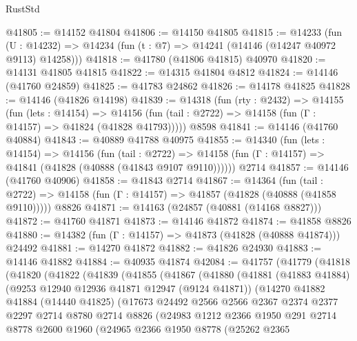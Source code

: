 \begin{lexlean}{RustStd}
\begin{coremodule}
@41805 := @14152 @41804
@41806 := @14150 @41805
@41815 := @14233
    (fun (U : @14232) => @14234 (fun (t : @7) => @14241 (@14146 (@14247 @40972 @9113) @14258)))
@41818 := @41780 (@41806 @41815) @40970
@41820 := @14131 @41805 @41815
@41822 := @14315 @41804 @4812
@41824 := @14146 (@41760 @24859)
@41825 := @41783 @24862
@41826 := @14178 @41825
@41828 := @14146 (@41826 @14198)
@41839 := @14318
    (fun (rty : @2432) =>
    @14155
      (fun (lets : @14154) =>
      @14156 (fun (tail : @2722) => @14158 (fun (Γ : @14157) => @41824 (@41828 @41793)))))
    @8598
@41841 := @14146 (@41760 @40884)
@41843 := @40889 @41788 @40975
@41855 := @14340
    (fun (lets : @14154) =>
    @14156
      (fun (tail : @2722) =>
      @14158 (fun (Γ : @14157) => @41841 (@41828 (@40888 (@41843 @9107 @9110))))))
    @2714
@41857 := @14146 (@41760 @40906)
@41858 := @41843 @2714
@41867 := @14364
    (fun (tail : @2722) => @14158 (fun (Γ : @14157) => @41857 (@41828 (@40888 (@41858 @9110)))))
    @8826
@41871 := @14163 (@24857 (@40881 (@14168 @8827)))
@41872 := @41760 @41871
@41873 := @14146 @41872
@41874 := @41858 @8826
@41880 := @14382 (fun (Γ : @14157) => @41873 (@41828 (@40888 @41874))) @24492
@41881 := @14270 @41872
@41882 := @41826 @24930
@41883 := @14146 @41882
@41884 := @40935 @41874
@42084 := @41757
    (@41779
      (@41818
        (@41820
          (@41822
            (@41839
              (@41855
                (@41867
                  (@41880
                    (@41881
                      (@41883 @41884)
                      (@9253 @12940 @12936 @41871 @12947 (@9124 @41871))
                      (@14270
                        @41882
                        @41884
                        (@14440 @41825)
                        (@17673
                          @24492
                          @2566
                          @2566
                          @2367
                          @2374
                          @2377
                          @2297
                          @2714
                          @8780
                          @2714
                          @8826
                          (@24983
                            @1212
                            @2366
                            @1950
                            @291
                            @2714
                            @8778
                            @2600
                            @1960
                            (@24965
                              @2366
                              @1950
                              @8778
                              (@25262
                                @2365

\end{coremodule}
\end{lexlean}
